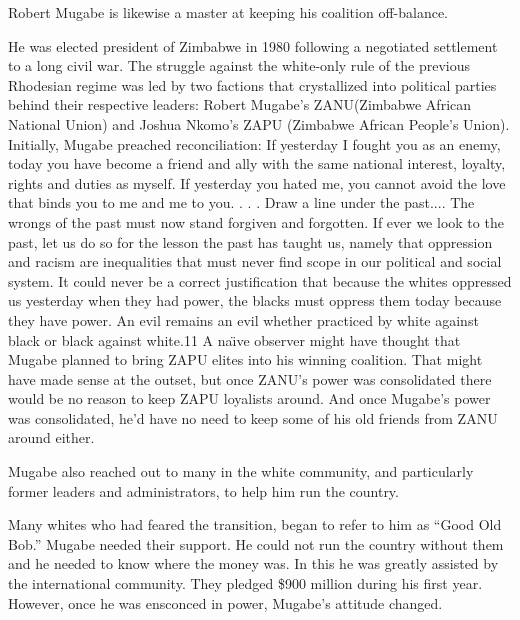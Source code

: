 \documentclass[10pt]{article}
\begin{document}
{\large Robert Mugabe is likewise a master at keeping his coalition
off-balance.}

{\large He was elected president of Zimbabwe in 1980 following a negotiated
settlement to a long civil war. The struggle against the white-only rule of the
previous Rhodesian regime was led by two factions that crystallized into
political parties behind their respective leaders: Robert Mugabe's ZANU(Zimbabwe
African National Union) and Joshua Nkomo's ZAPU (Zimbabwe African People's
Union). Initially, Mugabe preached reconciliation: If yesterday I fought you as
an enemy, today you have become a friend and ally with the same national
interest, loyalty, rights and duties as myself. If yesterday you hated me, you
cannot avoid the love that binds you to me and me to you. . . . Draw a line under
the past.... The wrongs of the past must now stand forgiven and forgotten. If
ever we look to the past, let us do so for the lesson the past has taught us,
namely that oppression and racism are inequalities that must never find scope in
our political and social system. It could never be a correct justification that
because the whites oppressed us yesterday when they had power, the blacks must
oppress them today because they have power. An evil remains an evil whether
practiced by white against black or black against white.11 A na\"{\i}ve observer
might have thought that Mugabe planned to bring ZAPU elites into his winning
coalition. That might have made sense at the outset, but once ZANU's power was
consolidated there would be no reason to keep ZAPU loyalists around. And once
Mugabe's power was consolidated, he'd have no need to keep some of his old
friends from ZANU around either.}

{\large Mugabe also reached out to many in the white community, and particularly
former leaders and administrators, to help him run the country.}

{\large Many whites who had feared the transition, began to refer to him as
``Good Old Bob.'' Mugabe needed their support. He could not run the country
without them and he needed to know where the money was. In this he was greatly
assisted by the international community. They pledged \$900 million during his
first year. However, once he was ensconced in power, Mugabe's attitude changed.}
\end{document}
